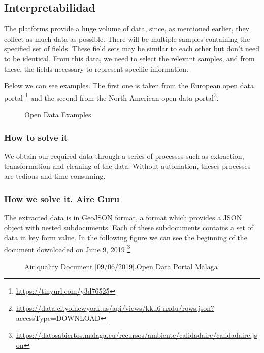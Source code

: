 \subsection{Interpretabilidad}
The platforms provide a huge volume of data, since, as mentioned earlier, they collect as much data as possible.
There will be multiple samples containing the specified set of fields. These field sets may be similar to each other but don't need to be identical.
From this data, we need to select the relevant samples, and from these, the fields necessary to represent specific information.


Below we can see examples. The first one is taken from the European open data portal
\footnote{\url{https://tinyurl.com/y3d76525}} and the second from the North American open data portal\footnote{\url{https://data.cityofnewyork.us/api/views/kku6-nxdu/rows.json?accessType=DOWNLOAD}}.

\begin{figure}[h]
    \centering
    \hfill
    \caption{Open Data Examples}
\end{figure}

    

    
\subsubsection{How to solve it} 
We obtain our required data through a series of processes such as extraction, transformation and
cleaning of the data. Without automation, theses processes are tedious and time consuming. 

\subsubsection{How we solve it. Aire Guru} 

The extracted data is in GeoJSON format, a format which provides a JSON object with nested subdocuments. Each of these
subdocuments contains a set of data in key form value.
In the following figure we can see the beginning of the document downloaded on June 9, 2019
\footnote{\url{https://datosabiertos.malaga.eu/recursos/ambiente/calidadaire/calidadaire.json}}\\
\newpage
\begin{figure}[h]
    \centering
   \hfill
 
    \caption{Air quality Document [09/06/2019].Open Data Portal Malaga}
    \end{figure}
    
